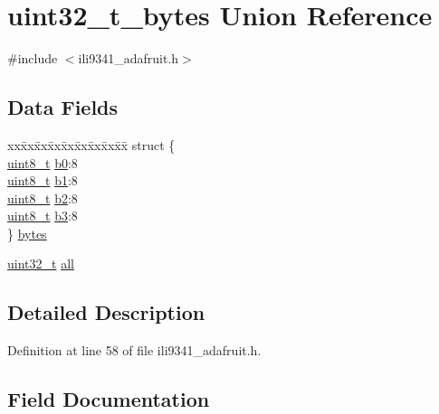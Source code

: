 \hypertarget{unionuint32__t__bytes}{}\section{uint32\+\_\+t\+\_\+bytes Union Reference}
\label{unionuint32__t__bytes}


{\ttfamily \#include $<$ili9341\+\_\+adafruit.\+h$>$}

\subsection*{Data Fields}
\begin{DoxyCompactItemize}
\item 
\begin{tabbing}
xx\=xx\=xx\=xx\=xx\=xx\=xx\=xx\=xx\=\kill
struct \{\\
\>\hyperlink{send_8c_aba7bc1797add20fe3efdf37ced1182c5}{uint8\_t} \hyperlink{unionuint32__t__bytes_a92b86537decb69327191d870f41c60f7}{b0}:8\\
\>\hyperlink{send_8c_aba7bc1797add20fe3efdf37ced1182c5}{uint8\_t} \hyperlink{unionuint32__t__bytes_a91fb31482a2ce44b454fca964dcd556b}{b1}:8\\
\>\hyperlink{send_8c_aba7bc1797add20fe3efdf37ced1182c5}{uint8\_t} \hyperlink{unionuint32__t__bytes_a462312b99de0c6d1c497064902196e1d}{b2}:8\\
\>\hyperlink{send_8c_aba7bc1797add20fe3efdf37ced1182c5}{uint8\_t} \hyperlink{unionuint32__t__bytes_abd7739cae59fab7cf712d53f337b378a}{b3}:8\\
\} \hyperlink{unionuint32__t__bytes_a50aeebe398ee3b740421f1cc8d8583b8}{bytes}\\

\end{tabbing}\item 
\hyperlink{send_8c_a435d1572bf3f880d55459d9805097f62}{uint32\+\_\+t} \hyperlink{unionuint32__t__bytes_a83b0c87830b60d185365dbadf8efd4a0}{all}
\end{DoxyCompactItemize}


\subsection{Detailed Description}


Definition at line 58 of file ili9341\+\_\+adafruit.\+h.



\subsection{Field Documentation}
